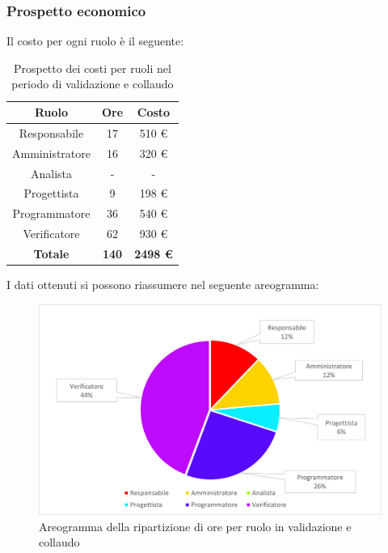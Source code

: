 \subsubsection{Prospetto economico}
Il costo per ogni ruolo è il seguente:
\begin{table}[H]
		\begin{center}
			\setlength{\aboverulesep}{0pt}
			\setlength{\belowrulesep}{0pt}
			\setlength{\extrarowheight}{.75ex}
			\begin{tabular}{ c c c }
				\rowcolor{AzzurroGruppo!30} 
				\textbf{Ruolo} & \textbf{Ore} & \textbf{Costo}  \\
				\toprule
				Responsabile   & 17 & 510 \euro \\
				Amministratore & 16 & 320 \euro \\
				Analista       & -  & - \\
				Progettista    & 9  & 198 \euro \\
				Programmatore  & 36 & 540 \euro \\
				Verificatore   & 62 & 930 \euro \\
				\textbf{Totale} & \textbf{140} & \textbf{2498 \euro} \\
				\bottomrule
			\end{tabular}
			\caption{ Prospetto dei costi per ruoli nel periodo di validazione e collaudo}
		\end{center}
	\end{table}
I dati ottenuti si possono riassumere nel seguente areogramma:
\begin{figure}[H]
    \centering
    \includegraphics[scale = 0.5]{components/img/Sprint-10-11-torta.png}
    \caption{ Areogramma della ripartizione di ore per ruolo in validazione e collaudo}
    \label{fig:Areogramma ripartizione ore , fase di validazione e collaudo}
\end{figure}
